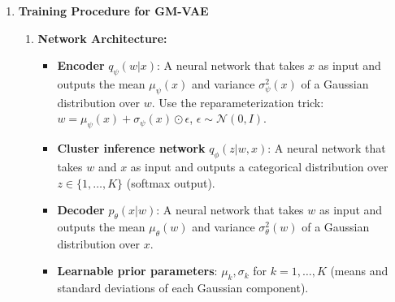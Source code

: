 \documentclass{article}
\begin{document}
{\begin{enumerate}
        The three terms can be interpreted as follows:
        \begin{itemize}
            \item \textbf{Term 1} (involving $p_\theta(x|w)$): Reconstruction term --- measures how well the decoder reconstructs $x$ from latent $w$.
            \item \textbf{Term 2} (involving $p_{\mu,\sigma}(w|z)$): Can be rewritten as $-\mathbb{E}_{q_\phi(z|w,x)}[\mathrm{KL}(q_\psi(w|x) \| p_{\mu,\sigma}(w|z))]$ --- regularizes the encoder $q_\psi(w|x)$ to match the Gaussian mixture component $p_{\mu,\sigma}(w|z)$.
            \item \textbf{Term 3} (involving $p(z)$): Equals $-\mathbb{E}_{q_\psi(w|x)}[\mathrm{KL}(q_\phi(z|w,x) \| p(z))]$ --- regularizes the cluster assignment $q_\phi(z|w,x)$ to match the prior $p(z)$.
        \end{itemize}

        \item \textbf{Training Procedure for GM-VAE}

        \begin{enumerate}
            \item \textbf{Network Architecture:}
            \begin{itemize}
                \item \textbf{Encoder} $q_\psi(w|x)$: A neural network that takes $x$ as input and outputs the mean $\mu_\psi(x)$ and variance $\sigma^2_\psi(x)$ of a Gaussian distribution over $w$. Use the reparameterization trick: $w = \mu_\psi(x) + \sigma_\psi(x) \odot \epsilon$, $\epsilon \sim \mathcal{N}(0,I)$.
                \item \textbf{Cluster inference network} $q_\phi(z|w,x)$: A neural network that takes $w$ and $x$ as input and outputs a categorical distribution over $z \in \{1,\ldots,K\}$ (softmax output).
                \item \textbf{Decoder} $p_\theta(x|w)$: A neural network that takes $w$ as input and outputs the mean $\mu_\theta(w)$ and variance $\sigma^2_\theta(w)$ of a Gaussian distribution over $x$.
                \item \textbf{Learnable prior parameters}: $\mu_k, \sigma_k$ for $k=1,\ldots,K$ (means and standard deviations of each Gaussian component).
            \end{itemize}


\end{enumerate}
\end{enumerate}}
\end{document}
